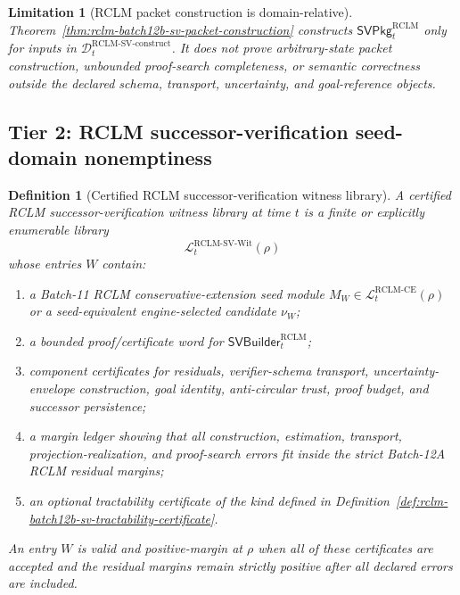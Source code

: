 \documentclass[11pt,a4paper]{article}
\newtheorem{definition}[theorem]{Definition}
\newtheorem{limitation}[theorem]{Limitation}
\newcommand{\Lcal}{\mathcal L}
\newcommand{\Dcal}{\mathcal D}
\newcommand{\RCLM}{\mathrm{RCLM}}
\newcommand{\CE}{\mathrm{CE}}
\begin{document}
\begin{limitation}[RCLM packet construction is domain-relative]
\label{lim:rclm-batch12b-packet-construction-domain-relative}
Theorem~\ref{thm:rclm-batch12b-sv-packet-construction} constructs \(\mathsf{SVPkg}_t^{\RCLM}\) only for inputs in \(\Dcal_t^{\RCLM\text{-}\mathrm{SV\mbox{-}construct}}\). It does not prove arbitrary-state packet construction, unbounded proof-search completeness, or semantic correctness outside the declared schema, transport, uncertainty, and goal-reference objects.
\end{limitation}

\subsection{Tier 2: RCLM successor-verification seed-domain nonemptiness}

\begin{definition}[Certified RCLM successor-verification witness library]
\label{def:rclm-batch12b-sv-witness-library}
A certified RCLM successor-verification witness library at time \(t\) is a finite or explicitly enumerable library
\[
\Lcal_t^{\RCLM\text{-}\mathrm{SV\mbox{-}Wit}}(\rho)
\]
whose entries \(W\) contain:
\begin{enumerate}[label=(\roman*),leftmargin=1.5em]
    \item a Batch-11 RCLM conservative-extension seed module \(M_W\in\Lcal_t^{\RCLM\text{-}\CE}(\rho)\) or a seed-equivalent engine-selected candidate \(\nu_W\);
    \item a bounded proof/certificate word for \(\mathsf{SVBuilder}_t^{\RCLM}\);
    \item component certificates for residuals, verifier-schema transport, uncertainty-envelope construction, goal identity, anti-circular trust, proof budget, and successor persistence;
    \item a margin ledger showing that all construction, estimation, transport, projection-realization, and proof-search errors fit inside the strict Batch-12A RCLM residual margins;
    \item an optional tractability certificate of the kind defined in Definition~\ref{def:rclm-batch12b-sv-tractability-certificate}.
\end{enumerate}
An entry \(W\) is valid and positive-margin at \(\rho\) when all of these certificates are accepted and the residual margins remain strictly positive after all declared errors are included.
\end{definition}
\end{document}
